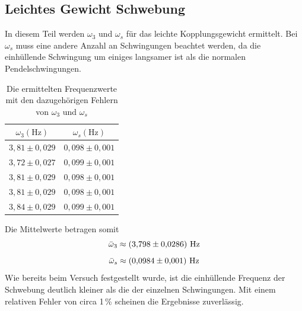 \subsection*{Leichtes Gewicht Schwebung}
In diesem Teil werden $\omega_3$ und $\omega_s$ für das leichte Kopplungsgewicht ermittelt. Bei $\omega_s$ muss eine andere Anzahl an Schwingungen beachtet werden, da die einhüllende Schwingung um einiges langsamer ist als die normalen Pendelschwingungen. 
\begin{table}[H]
    \centering
    \begin{tabular}{c|c}
        $\omega_3 \left(\text{Hz}\right)$ & $\omega_s \left(\text{Hz}\right)$ \\
        \hline
        $3{,}81 \pm 0{,}029$ & $0{,}098 \pm 0{,}001$ \\
        $3{,}72 \pm 0{,}027$ & $0{,}099 \pm 0{,}001$ \\
        $3{,}81 \pm 0{,}029$ & $0{,}098 \pm 0{,}001$ \\
        $3{,}81 \pm 0{,}029$ & $0{,}098 \pm 0{,}001$ \\
        $3{,}84 \pm 0{,}029$ & $0{,}099 \pm 0{,}001$ \\
    \end{tabular}
    \caption{Die ermittelten Frequenzwerte mit den dazugehörigen Fehlern von $\omega_3$ und $\omega_s$}
\end{table}
Die Mittelwerte betragen somit
\begin{equation*}
    \centering
    \bar{\omega}_3 \approx \left(3{,}798 \pm 0{,}0286 \right)\,\text{Hz}
\end{equation*}
\begin{equation*}
    \centering
    \bar{\omega}_s \approx \left(0{,}0984 \pm 0{,}001 \right)\,\text{Hz}
\end{equation*}
Wie bereits beim Versuch festgestellt wurde, ist die einhüllende Frequenz der Schwebung deutlich kleiner als die der einzelnen Schwingungen. Mit einem relativen Fehler von circa 1\,\% scheinen die Ergebnisse zuverlässig.


